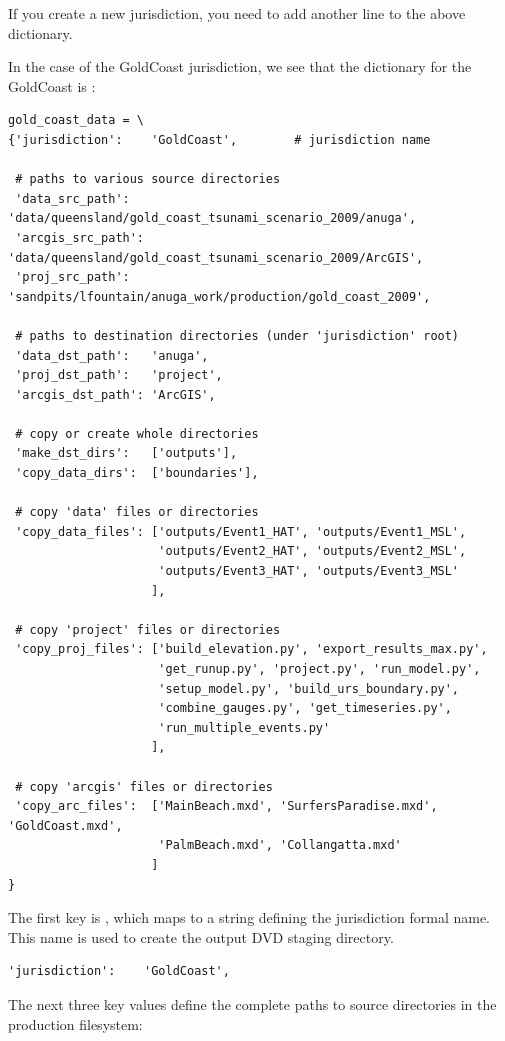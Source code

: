 \documentclass{manual}
\begin{document}
If you create a new jurisdiction, you need to add another line to the above dictionary.

\pagebreak

In the case of the GoldCoast jurisdiction, we see that the dictionary for the GoldCoast is 
:

\begin{verbatim}
gold_coast_data = \
{'jurisdiction':    'GoldCoast',        # jurisdiction name

 # paths to various source directories
 'data_src_path':   'data/queensland/gold_coast_tsunami_scenario_2009/anuga',
 'arcgis_src_path': 'data/queensland/gold_coast_tsunami_scenario_2009/ArcGIS',
 'proj_src_path':   'sandpits/lfountain/anuga_work/production/gold_coast_2009',

 # paths to destination directories (under 'jurisdiction' root)
 'data_dst_path':   'anuga',
 'proj_dst_path':   'project',
 'arcgis_dst_path': 'ArcGIS',

 # copy or create whole directories
 'make_dst_dirs':   ['outputs'],
 'copy_data_dirs':  ['boundaries'],

 # copy 'data' files or directories
 'copy_data_files': ['outputs/Event1_HAT', 'outputs/Event1_MSL',
                     'outputs/Event2_HAT', 'outputs/Event2_MSL',
                     'outputs/Event3_HAT', 'outputs/Event3_MSL'
                    ],

 # copy 'project' files or directories
 'copy_proj_files': ['build_elevation.py', 'export_results_max.py',
                     'get_runup.py', 'project.py', 'run_model.py',
                     'setup_model.py', 'build_urs_boundary.py',
                     'combine_gauges.py', 'get_timeseries.py',
                     'run_multiple_events.py'
                    ],

 # copy 'arcgis' files or directories
 'copy_arc_files':  ['MainBeach.mxd', 'SurfersParadise.mxd', 'GoldCoast.mxd',
                     'PalmBeach.mxd', 'Collangatta.mxd'
                    ]
}
\end{verbatim}

The first key is , which maps to a string defining the jurisdiction formal name. 
This name is used to create the output DVD staging directory.

\begin{verbatim}
'jurisdiction':    'GoldCoast',
\end{verbatim}

The next three key values define the complete paths to source directories in the production filesystem:
\end{document}
